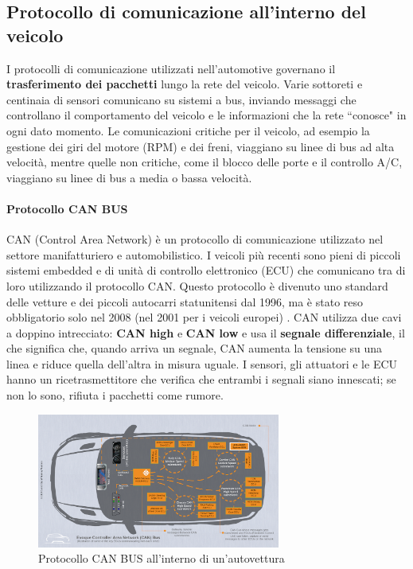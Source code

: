 \documentclass[12pt, a4paper, italian]{report}
\numberwithin{figure}{chapter}
\numberwithin{table}{chapter}
\begin{document}
\subsection{Protocollo di comunicazione all'interno del veicolo}
I protocolli di comunicazione utilizzati nell'automotive governano il \textbf{trasferimento dei pacchetti} lungo la rete del veicolo. Varie sottoreti e centinaia di sensori comunicano su sistemi a bus, inviando messaggi che controllano il comportamento del veicolo e le informazioni che la rete ``conosce" in ogni dato momento.
Le comunicazioni critiche per il veicolo, ad esempio la gestione dei giri del motore (RPM) e dei freni, viaggiano su linee di bus ad alta velocità, mentre quelle non critiche, come il blocco delle porte e il controllo A/C, viaggiano su linee di bus a media o bassa velocità.
\paragraph{Protocollo CAN BUS} CAN (Control Area Network) è un protocollo di comunicazione utilizzato nel settore manifatturiero e automobilistico. I veicoli più recenti sono pieni di piccoli sistemi embedded e di unità di controllo elettronico (ECU) che comunicano tra di loro utilizzando il protocollo CAN. Questo protocollo è divenuto uno standard delle vetture e dei piccoli autocarri statunitensi dal 1996, ma è stato reso obbligatorio solo nel 2008 (nel 2001 per i veicoli europei) \cite{manualeHacker}. CAN utilizza due cavi a doppino intrecciato: \textbf{CAN high} e \textbf{CAN low} e usa il \textbf{segnale differenziale}, il che significa che, quando arriva un segnale, CAN aumenta la tensione su una linea e riduce quella dell'altra in misura uguale. I sensori, gli attuatori e le ECU hanno un ricetrasmettitore che verifica che entrambi i segnali siano innescati; se non lo sono, rifiuta i pacchetti come rumore. 

\begin{figure}[h]
  \centering
  \includegraphics[width=8cm]{CAN_auto.png}
  \caption{Protocollo CAN BUS all'interno di un'autovettura}
  \label{fig:Protocallo CAN-BUS}
\end{figure}
\end{document}
